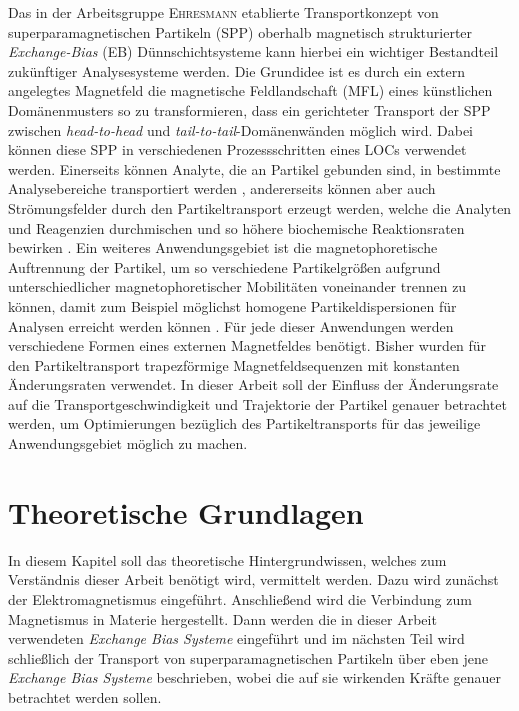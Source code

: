 \documentclass[page,pdftex,12pt,a4paper,twoside,openright]{scrbook}
\begin{document}
Das in der Arbeitsgruppe \textsc{Ehresmann} etablierte Transportkonzept von superparamagnetischen Partikeln (SPP) oberhalb magnetisch strukturierter \emph{Exchange-Bias} (EB) Dünnschichtsysteme kann hierbei ein wichtiger Bestandteil zukünftiger Analysesysteme werden. Die Grundidee ist es durch ein extern angelegtes Magnetfeld die magnetische Feldlandschaft (MFL) eines künstlichen Domänenmusters so zu transformieren, dass ein gerichteter Transport der SPP zwischen \emph{head-to-head} und \emph{tail-to-tail}-Domänenwänden möglich wird. Dabei können diese SPP in verschiedenen Prozessschritten eines LOCs verwendet werden. Einerseits können Analyte, die an Partikel gebunden sind, in bestimmte Analysebereiche transportiert werden \cite{ehresmann_asymmetric_2011}, andererseits können aber auch Strömungsfelder durch den Partikeltransport erzeugt werden, welche die Analyten und Reagenzien durchmischen und so höhere biochemische Reaktionsraten bewirken \cite{holzinger_controlled_2012}. Ein weiteres Anwendungsgebiet ist die magnetophoretische Auftrennung der Partikel, um so verschiedene Partikelgrößen aufgrund unterschiedlicher magnetophoretischer Mobilitäten voneinander trennen zu können, damit zum Beispiel möglichst homogene Partikeldispersionen für Analysen erreicht werden können \cite{zhou_magnetic_2016}. Für jede dieser Anwendungen werden verschiedene Formen eines externen Magnetfeldes benötigt. Bisher wurden für den Partikeltransport trapezförmige Magnetfeldsequenzen mit konstanten Änderungsraten verwendet. In dieser Arbeit soll der Einfluss der Änderungsrate auf die Transportgeschwindigkeit und Trajektorie der Partikel genauer betrachtet werden, um Optimierungen bezüglich des Partikeltransports für das jeweilige Anwendungsgebiet möglich zu machen.
\chapter{Theoretische Grundlagen \label{sec-grundlagen}}
\label{sec:orga0c9f63}
In diesem Kapitel soll das theoretische Hintergrundwissen, welches zum Verständnis dieser Arbeit benötigt wird, vermittelt werden. Dazu wird zunächst der Elektromagnetismus eingeführt. Anschließend wird die Verbindung zum Magnetismus in Materie hergestellt. Dann werden die in dieser Arbeit verwendeten \emph{Exchange Bias Systeme} eingeführt und im nächsten Teil wird schließlich der Transport von superparamagnetischen Partikeln über eben jene \emph{Exchange Bias Systeme} beschrieben, wobei die auf sie wirkenden Kräfte genauer betrachtet werden sollen.
\end{document}
